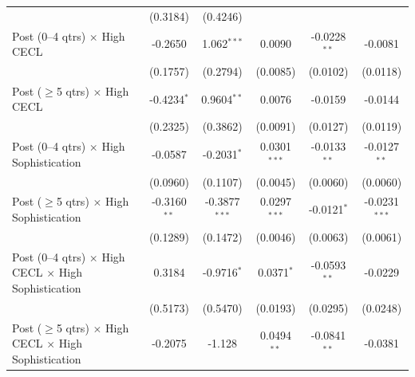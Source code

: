 \begin{tabular}{lccccc}
                                                                          & (0.3184)                      & (0.4246)                    &                       &                &   \\   
   Post (0--4 qtrs) $\times$ High CECL                                    & -0.2650                       & 1.062$^{***}$               & 0.0090                & -0.0228$^{**}$ & -0.0081\\   
                                                                          & (0.1757)                      & (0.2794)                    & (0.0085)              & (0.0102)       & (0.0118)\\   
   Post ($\geq$5 qtrs) $\times$ High CECL                                 & -0.4234$^{*}$                 & 0.9604$^{**}$               & 0.0076                & -0.0159        & -0.0144\\   
                                                                          & (0.2325)                      & (0.3862)                    & (0.0091)              & (0.0127)       & (0.0119)\\   
   Post (0--4 qtrs) $\times$ High Sophistication                          & -0.0587                       & -0.2031$^{*}$               & 0.0301$^{***}$        & -0.0133$^{**}$ & -0.0127$^{**}$\\   
                                                                          & (0.0960)                      & (0.1107)                    & (0.0045)              & (0.0060)       & (0.0060)\\   
   Post ($\geq$5 qtrs) $\times$ High Sophistication                       & -0.3160$^{**}$                & -0.3877$^{***}$             & 0.0297$^{***}$        & -0.0121$^{*}$  & -0.0231$^{***}$\\   
                                                                          & (0.1289)                      & (0.1472)                    & (0.0046)              & (0.0063)       & (0.0061)\\   
   Post (0--4 qtrs) $\times$ High CECL $\times$ High Sophistication       & 0.3184                        & -0.9716$^{*}$               & 0.0371$^{*}$          & -0.0593$^{**}$ & -0.0229\\   
                                                                          & (0.5173)                      & (0.5470)                    & (0.0193)              & (0.0295)       & (0.0248)\\   
   Post ($\geq$5 qtrs) $\times$ High CECL $\times$ High Sophistication    & -0.2075                       & -1.128                      & 0.0494$^{**}$         & -0.0841$^{**}$ & -0.0381\\   

\end{tabular}
